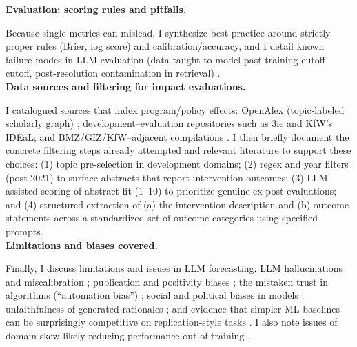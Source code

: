 \documentclass[12pt,a4paper]{article}
\let\citep\parencite
\begin{document}
\textbf{Evaluation: scoring rules and pitfalls.}

Because single metrics can mislead, I synthesize best practice around strictly proper rules (Brier, log score) and calibration/accuracy, and I detail known failure modes in LLM evaluation (data taught to model past training cutoff cutoff, post-resolution contamination in retrieval) \citep{gneitingStrictlyProperScoring2007,palekaPitfallsEvaluatingLanguage2025}.\\


\textbf{Data sources and filtering for impact evaluations.}

I catalogued sources that index program/policy effects: OpenAlex (topic-labeled scholarly graph) \citep{priemOpenAlexFullyopenIndex2022,OpenAlexTopicClassification}; development–evaluation repositories such as 3ie and KfW’s IDEaL; and BMZ/GIZ/KfW–adjacent compilations \citep{3ieDevelopmentEvidence,kfwdevelopmentbankIDEaL,DatenlaborbmzAwesomedevelopmentcooperationdata2025}. I then briefly document the concrete filtering steps already attempted and relevant literature to support these choices: (1) topic pre-selection in development domains; (2) regex and year filters (post-2021) to surface abstracts that report intervention outcomes; (3) LLM-assisted scoring of abstract fit (1–10) to prioritize genuine ex-post evaluations; and (4) structured extraction of (a) the intervention description and (b) outcome statements across a standardized set of outcome categories using specified prompts.\\


\textbf{Limitations and biases covered.}

Finally, I discuss limitations and issues in LLM forecasting: LLM hallucinations and miscalibration \citep{huangSurveyHallucinationLarge2025,lyuCalibratingLargeLanguage2025}; publication and positivity biases \citep{duyxStrongFocusPositive2019,ioannidisWhyMostPublished2005}; the mistaken trust in algorithms (``automation bias'') \citep{AlgorithmAppreciationPeople2019}; social and political biases in models \citep{nadeemStereoSetMeasuringStereotypical2021,bangMeasuringPoliticalBias2024}; unfaithfulness of generated rationales \citep{turpinLanguageModelsDont2023}; and evidence that simpler ML baselines can be surprisingly competitive on replication-style tasks \citep{yangEstimatingDeepReplicability2020}. I also note issues of domain skew likely reducing performance out-of-training \citep{palekaPitfallsEvaluatingLanguage2025}.\\


\printbibliography
\end{document}
